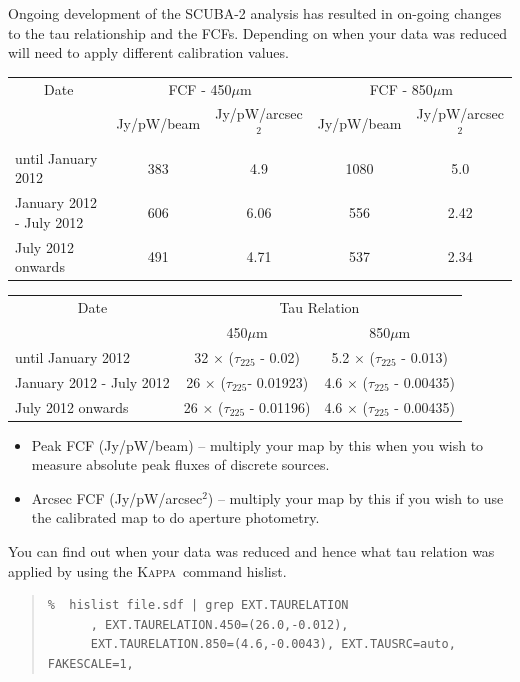 \documentclass[twoside,11pt]{article}
\newcommand{\xref}[3]{#1}
\renewcommand{\_}{\texttt{\symbol{95}}}
\newenvironment{myquote}{\begin{quote}\begin{small}}{\end{small}\end{quote}}
\newcommand{\Kappa}{\xref{\textsc{Kappa}}{sun95}{}}
\newcommand{\task}[1]{\textsf{#1}}
\newcommand{\hislist}{\xref{\task{hislist}}{sun95}{HISLIST}}
\begin{document}
Ongoing development of the SCUBA-2 analysis has resulted in on-going
changes to the tau relationship and the FCFs. Depending on when your
data was reduced will need to apply different calibration values.
\\
\begin{table}[h!]
\begin{center}
\begin{tabular}{|l|c|c|c|c|}
 \hline
 \multicolumn{1}{|c|}{Date}      &
 \multicolumn{2}{c|}{FCF - 450$\mu$m}  &
\multicolumn{2}{c|}{FCF - 850$\mu$m}      \\
\cline{2-5}
& Jy/pW/beam &Jy/pW/arcsec$^2$ & Jy/pW/beam &Jy/pW/arcsec$^2$ \\
 \hline
until January 2012 &383  & 4.9&1080 &5.0 \\
January 2012 - July 2012&606&6.06 &556 &2.42 \\
July 2012 onwards&491 &4.71 &537 &2.34 \\
\hline
\end{tabular}
\end{center}
\end{table}
\vspace{-2mm}
\begin{table}[h!]
\begin{center}
\begin{tabular}{|l|c|c|}
 \hline
 \multicolumn{1}{|c}{Date} & \multicolumn{2}{|c|}{Tau Relation}  \\ \cline{2-3}
                           & 450$\mu$m  & 850$\mu$m \\ \hline
until January 2012       & 32 $\times$ ($\tau_{225}$ - 0.02)    & 5.2 $\times$ ($\tau_{225}$ - 0.013)  \\
January 2012 - July 2012 & 26 $\times$ ($\tau_{225}$- 0.01923)  & 4.6 $\times$ ($\tau_{225}$ - 0.00435)  \\
July 2012 onwards        & 26 $\times$ ($\tau_{225}$ - 0.01196) & 4.6 $\times$ ($\tau_{225}$ - 0.00435)  \\
\hline
\end{tabular}
\end{center}
\end{table}

\vspace{-5mm}
\begin{itemize}
\item Peak FCF (Jy/pW/beam) -- multiply your map by this when you wish
to measure absolute peak fluxes of discrete sources.
\item Arcsec FCF (Jy/pW/arcsec$^2$) -- multiply your map by this if
you wish to use the calibrated map to do aperture photometry.
\end{itemize}
You can find out when your data was reduced and hence what tau
relation was applied by using the \Kappa\ command \hislist.
\vspace{-2mm}
\begin{myquote}
\begin{verbatim}
%  hislist file.sdf | grep EXT.TAURELATION
      , EXT.TAURELATION.450=(26.0,-0.012),
      EXT.TAURELATION.850=(4.6,-0.0043), EXT.TAUSRC=auto, FAKESCALE=1,
\end{verbatim}
\end{myquote}
\end{document}
